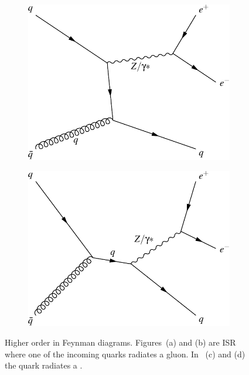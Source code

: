 \begin{figure}[!p]
\begin{subfigure}[b]{\SideBySidePlotWidth}
        \includegraphics[width=\linewidth]{figures/feyn_qg_to_zq.pdf}
        \caption{}
        \label{fig:feyn_qg_to_zq}
    \end{subfigure}%
    \begin{subfigure}[b]{\SideBySidePlotWidth}
        \includegraphics[width=\linewidth]{figures/feyn_qg_to_q_to_zq.pdf}
        \caption{}
        \label{fig:feyn_qg_to_q_to_zq}
    \end{subfigure}
    \caption[
        Higher order in \alphastrong \Ztoee Feynman diagrams.
    ]{
        Higher order in \alphastrong \Ztoee Feynman diagrams. Figures~(a) and
        (b) are ISR where one of the incoming quarks radiates a gluon. In
        \FIGS~(c) and (d) the quark radiates a \Z.
    }
    \label{fig:higher_order_z_diagrams}
\end{figure}
